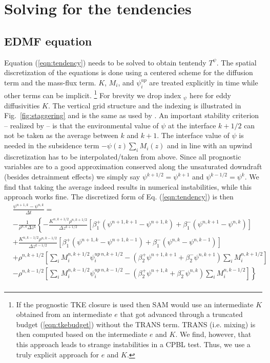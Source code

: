 \documentclass[dvipdfmx,a4paper,10pt]{article}
\begin{document}
\section{Solving for the tendencies}\label{sec:solve}

\subsection{EDMF equation}

Equation (\ref{eqn:tendency}) needs to be solved to obtain tentendy $T^{\psi}$. The spatial discretization of the equations is done using a centered scheme for the diffusion term and the mass-flux term. $K$, $M_i$, and $\psi^{up}_i$ are treated explicitly in time while other terms can be implicit. \footnote{{\color{blue} If the prognostic TKE closure is used then SAM would use an intermediate $K$ obtained from an intermediate $e$ that got advanced through a truncated budget (\ref{eqn:tkebudget}) without the TRANS term. TRANS (i.e. mixing) is then computed based on the intermediate $e$ and $K$. We find, however, that this approach leads to strange instabilities in a CPBL test. Thus, we use a truly explicit approach for $e$ and $K$.}} For brevity we drop index $_\psi$ here for eddy diffusivities $K$. The vertical grid structure and the indexing is illustrated in Fig.~\ref{fig:staggering} and is the same as used by \cite{tiedtke89}. An important stability criterion -- realized by \cite{tiedtke89} -- is that the environmental value of $\psi$ at the interface $k+1/2$ can not be taken as the average between $k$ and $k+1$. The interface value of $\psi$ is needed in the subsidence term $- \psi(z) \sum_i M_i(z)$ and in line with an upwind discretization has to be interpolated/taken from above. Since all prognostic variables are to a good approximation conserved along the unsaturated downdraft (besides detrainment effects) we simply say $\psi^{k+1/2}=\psi^{k+1}$ and  $\psi^{k-1/2}=\psi^{k}$. We find that taking the average indeed results in numerical instabilities, while this approach works fine. The discretized form of Eq. (\ref{eqn:tendency}) is then
\begin{align*}
  &\frac{\psi^{n+1,k}- \psi^{n,k} }{\Delta t} =\\
  &-\frac{1}{\rho^{n,k}\Delta z^{k}}\left\{ -\frac{K^{n,k+1/2}\rho^{n,k+1/2} }{\Delta z^{k+1/2}} [\beta_1^+(\psi^{n+1,k+1}-\psi^{n+1,k}) + \beta_1^-(\psi^{n,k+1}-\psi^{n,k})] \right. \\
    & \left.+\frac{K^{n,k-1/2}\rho^{n,k-1/2} }{\Delta z^{k-1/2}} [\beta_1^+(\psi^{n+1,k}-\psi^{n+1,k-1}) + \beta_1^-(\psi^{n,k}-\psi^{n,k-1})] \right.\\
    & \left. +\rho^{n,k+1/2}\left[\sum_i M_i^{n,k+1/2}\psi_i^{up~n,k+1/2} - (\beta_2^+\psi^{n+1,k+1}+\beta_2^-\psi^{n,k+1} )\sum_i M_i^{n,k+1/2} \right]\right.\\
    &\left.-\rho^{n,k-1/2}\left[\sum_i M_i^{n,k-1/2}\psi_i^{up~n,k-1/2} -(\beta_2^+\psi^{n+1,k}+\beta_2^-\psi^{n,k} )\sum_i M_i^{n,k-1/2} \right] \right\}\\
\end{align*}
\end{document}
